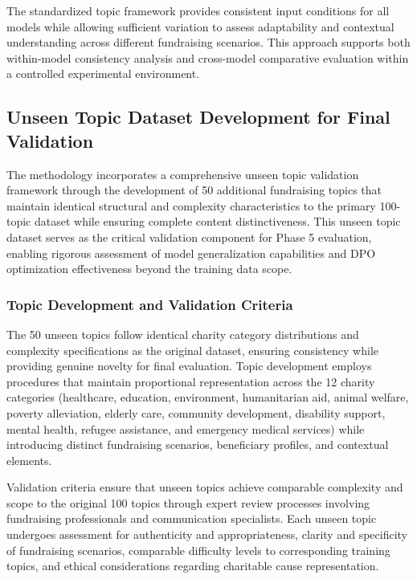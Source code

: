 The standardized topic framework provides consistent input conditions for all models while allowing sufficient variation to assess adaptability and contextual understanding across different fundraising scenarios. This approach supports both within-model consistency analysis and cross-model comparative evaluation within a controlled experimental environment.

\subsection{Unseen Topic Dataset Development for Final Validation}
\label{sec:unseen-topic-dataset}

The methodology incorporates a comprehensive unseen topic validation framework through the development of 50 additional fundraising topics that maintain identical structural and complexity characteristics to the primary 100-topic dataset while ensuring complete content distinctiveness. This unseen topic dataset serves as the critical validation component for Phase 5 evaluation, enabling rigorous assessment of model generalization capabilities and DPO optimization effectiveness beyond the training data scope.

\subsubsection{Topic Development and Validation Criteria}

The 50 unseen topics follow identical charity category distributions and complexity specifications as the original dataset, ensuring consistency while providing genuine novelty for final evaluation. Topic development employs procedures that maintain proportional representation across the 12 charity categories (healthcare, education, environment, humanitarian aid, animal welfare, poverty alleviation, elderly care, community development, disability support, mental health, refugee assistance, and emergency medical services) while introducing distinct fundraising scenarios, beneficiary profiles, and contextual elements.

Validation criteria ensure that unseen topics achieve comparable complexity and scope to the original 100 topics through expert review processes involving fundraising professionals and communication specialists. Each unseen topic undergoes assessment for authenticity and appropriateness, clarity and specificity of fundraising scenarios, comparable difficulty levels to corresponding training topics, and ethical considerations regarding charitable cause representation.

